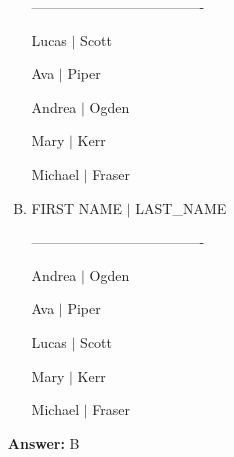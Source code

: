 \documentclass[12pt]{article}
\begin{document}
\begin{enumerate}[1.]
\begin{enumerate}[A.]
        -------------------------------------

        Lucas $\vert$ Scott

        Ava $\vert$   Piper

        Andrea $\vert$ Ogden

        Mary $\vert$  Kerr

        Michael $\vert$ Fraser
        \item
        FIRST NAME     $\vert$    LAST\_NAME

        -------------------------------------

        Andrea $\vert$ Ogden

        Ava $\vert$   Piper

        Lucas $\vert$ Scott

        Mary $\vert$  Kerr

        Michael $\vert$ Fraser
    \end{enumerate}

    \bigskip

    \textbf{Answer:} B

\end{enumerate}
\end{document}
